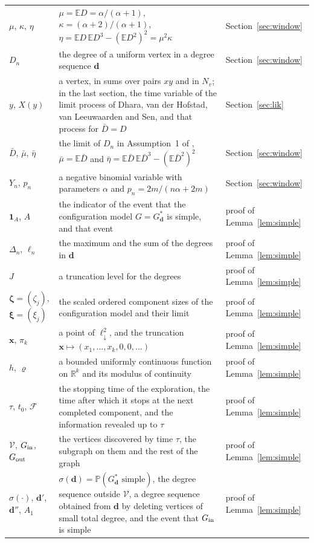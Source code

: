 \documentclass[11pt]{amsart}
\theoremstyle{remark}
\numberwithin{equation}{section}
\newcommand{\PP}{\mathbb{P}}
\newcommand{\EE}{\mathbb{E}}
\newcommand{\ldown}{\ell^2_{\downarrow}}
\begin{document}
{\begin{longtable}{@{}lp{}l@{}}
$\mu$, $\kappa$, $\eta$ & $\mu=\EE D=\alpha/(\alpha+1)$, $\kappa=(\alpha+2)/(\alpha+1)$, $\eta=\EE D\,\EE D^3-(\EE D^2)^2=\mu^2\kappa$ & Section~\ref{sec:window} \\
$D_n$ & the degree of a uniform vertex in a degree sequence $\boldsymbol d$ & Section~\ref{sec:window} \\
$y$, $X(y)$ & a vertex, in sums over pairs $xy$ and in $N_v$; in the last section, the time variable of the limit process of Dhara, van der Hofstad, van Leeuwaarden and Sen, and that process for $\bar D=D$ & Section~\ref{sec:lik} \\
$\bar D$, $\bar\mu$, $\bar\eta$ & the limit of $D_n$ in Assumption~1 of \cite{DHLS17}, $\bar\mu=\EE\bar D$ and $\bar\eta=\EE\bar D\,\EE\bar D^3-(\EE\bar D^2)^2$ & Section~\ref{sec:window} \\
$Y_n$, $p_n$ & a negative binomial variable with parameters $\alpha$ and $p_n=2m/(n\alpha+2m)$ & Section~\ref{sec:window} \\
$\mathbf 1_A$, $A$ & the indicator of the event that the configuration model $G=G^*_{\boldsymbol d}$ is simple, and that event & proof of Lemma~\ref{lem:simple} \\
$\Delta_n$, $\ell_n$ & the maximum and the sum of the degrees in $\boldsymbol d$ & proof of Lemma~\ref{lem:simple} \\
$J$ & a truncation level for the degrees & proof of Lemma~\ref{lem:simple} \\
$\boldsymbol\zeta=(\zeta_j)$, $\boldsymbol\xi=(\xi_j)$ & the scaled ordered component sizes of the configuration model and their limit & proof of Lemma~\ref{lem:simple} \\
$\boldsymbol x$, $\pi_k$ & a point of $\ldown$, and the truncation $\boldsymbol x\mapsto(x_1,\dots,x_k,0,0,\dots)$ & proof of Lemma~\ref{lem:simple} \\
$h$, $\varrho$ & a bounded uniformly continuous function on $\mathbb R^k$ and its modulus of continuity & proof of Lemma~\ref{lem:simple} \\
$\tau$, $t_0$, $\mathcal F$ & the stopping time of the exploration, the time after which it stops at the next completed component, and the information revealed up to $\tau$ & proof of Lemma~\ref{lem:simple} \\
$\mathcal V$, $G_{\rm in}$, $G_{\rm out}$ & the vertices discovered by time $\tau$, the subgraph on them and the rest of the graph & proof of Lemma~\ref{lem:simple} \\
$\sigma(\cdot)$, $\boldsymbol d'$, $\boldsymbol d''$, $A_1$ & $\sigma(\boldsymbol d)=\PP(G^*_{\boldsymbol d}\text{ simple})$, the degree sequence outside $\mathcal V$, a degree sequence obtained from $\boldsymbol d$ by deleting vertices of small total degree, and the event that $G_{\rm in}$ is simple & proof of Lemma~\ref{lem:simple} \\

\end{longtable}}
\end{document}
